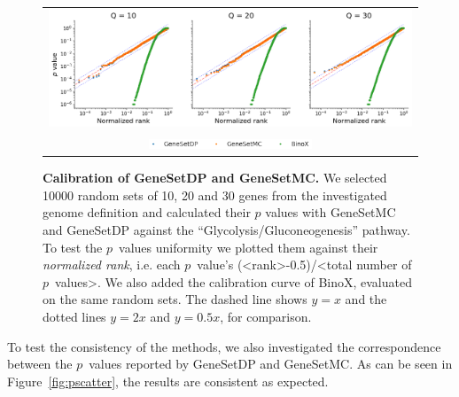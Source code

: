 \documentclass[10pt,letterpaper]{article}
\begin{document}
\begin{figure}[htb]
  \begin{center}
		  \begin{tabular}[t]{c}
				\includegraphics[width=.9\textwidth]{figures/calibration_multiple.png} \\
				\includegraphics[width=0.45\textwidth]{figures/calibration_legend.png}
		\end{tabular}
  \end{center}
  \caption{{\bf Calibration of GeneSetDP and GeneSetMC.} We selected 10000 random sets of 10, 20 and 30 genes from the investigated genome definition and calculated their $p$ values with GeneSetMC and GeneSetDP against the ``Glycolysis/Gluconeogenesis'' pathway. To test the $p$~values uniformity we plotted them against their {\em normalized rank}, i.e. each $p$~value's (<rank>-0.5)/<total number of $p$~values>. We also added the calibration curve of BinoX, evaluated on the same random sets. The dashed line shows $y = x$ and the dotted lines $y = 2x$ and $y = 0.5x$, for comparison.}
  \label{fig:calibration}
\end{figure}

To test the consistency of the methods, we also investigated the correspondence between the $p$~values reported by GeneSetDP and GeneSetMC. As can be seen in Figure~\ref{fig:pscatter}, the results are consistent as expected.
\end{document}
